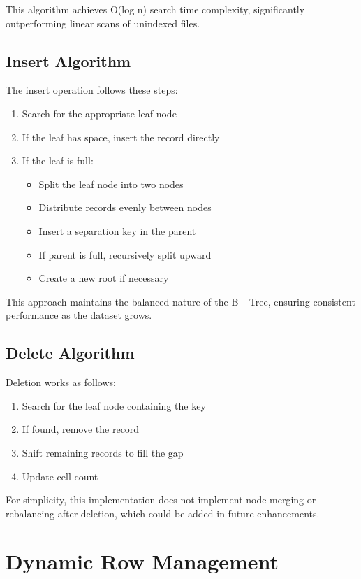 \documentclass[12pt,a4paper]{article}  %
\begin{document}
This algorithm achieves O(log n) search time complexity, significantly outperforming linear scans of unindexed files.

\subsection{Insert Algorithm}
The insert operation follows these steps:

\begin{enumerate}
    \item Search for the appropriate leaf node
    \item If the leaf has space, insert the record directly
    \item If the leaf is full:
        \begin{itemize}
            \item Split the leaf node into two nodes
            \item Distribute records evenly between nodes
            \item Insert a separation key in the parent
            \item If parent is full, recursively split upward
            \item Create a new root if necessary
        \end{itemize}
\end{enumerate}

This approach maintains the balanced nature of the B+ Tree, ensuring consistent performance as the dataset grows.

\subsection{Delete Algorithm}
Deletion works as follows:

\begin{enumerate}
    \item Search for the leaf node containing the key
    \item If found, remove the record
    \item Shift remaining records to fill the gap
    \item Update cell count
\end{enumerate}

For simplicity, this implementation does not implement node merging or rebalancing after deletion, which could be added in future enhancements.

\section{Dynamic Row Management}
\end{document}
